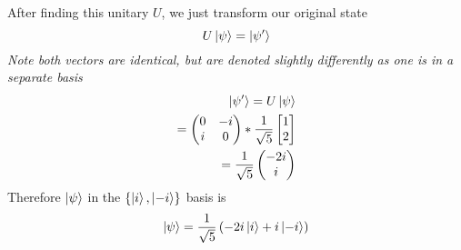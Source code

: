 \documentclass[]{article}
\begin{document}
After finding this unitary \(U\), we just transform our original state
\[
U\ket{\psi}  = \ket{\psi'} 
\] \emph{Note both vectors are identical, but are denoted slightly
differently as one is in a separate basis} \[
\begin{align}
\ket{\psi'}  = U\ket{\psi} \\
=\begin{pmatrix}
0 & -i \\
i & 0
\end{pmatrix}* \frac{1}{\sqrt{ 5 }}\begin{bmatrix}
1 \\
2
\end{bmatrix} \\
= \frac{1}{\sqrt{ 5 }}\begin{pmatrix}
-2i \\
i
\end{pmatrix}
\end{align}
\] Therefore \(\ket{\psi}\) in the \(\left\{ \ket{i},\ket{-i} \right\}\)
basis is \[
\ket{\psi}  = \frac{1}{\sqrt{ 5 }}\left( -2i\ket{i} +i\ket{-i}  \right) 
\]
\end{document}
